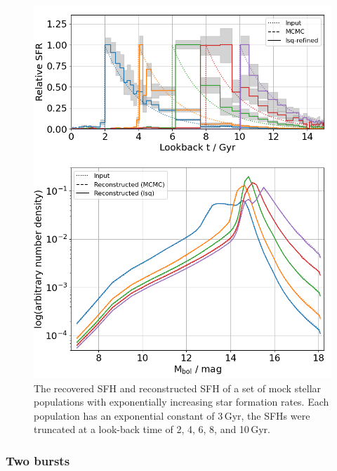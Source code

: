 \documentclass[fleqn,usenatbib]{mnras}
\begin{document}
\begin{figure}
  \includegraphics[width=\columnwidth]{figures/fig_01_exponential_decay_wdlf.png}
  \caption{The recovered SFH and reconstructed SFH of a set of mock stellar populations with exponentially increasing star formation rates. Each population has an exponential constant of 3\,Gyr, the SFHs were truncated at a look-back time of 2, 4, 6, 8, and 10\,Gyr.}
  \label{fig:exponential_sfh}
\end{figure}

\subsubsection*{Two bursts}
\end{document}
